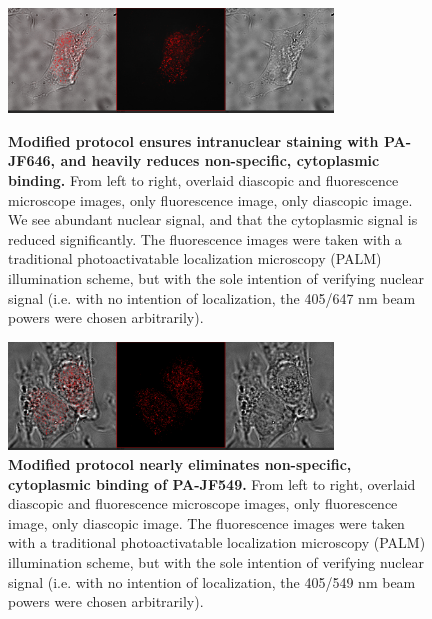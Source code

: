 \documentclass[%
 reprint,
 amsmath,amssymb,
 aps,
nobalancelastpage
]{revtex4-1}
\begin{document}
\begin{figure}[b] 
\includegraphics[width=3.4in]{Halo-tag PA646 - Fusion - 2x Mag - Area 1 - overlay.jpg}
\caption{\small \textbf{Modified protocol ensures intranuclear staining with PA-JF646, and heavily reduces non-specific, cytoplasmic binding.} From left to right, overlaid diascopic and fluorescence microscope images, only fluorescence image, only diascopic image. We see abundant nuclear signal, and that the cytoplasmic signal is reduced significantly. The fluorescence images were taken with a traditional photoactivatable localization microscopy (PALM) illumination scheme, but with the sole intention of verifying nuclear signal (i.e. with no intention of localization, the 405/647 nm beam powers were chosen arbitrarily).}
\label{fig1}
\hspace{1cm}
\includegraphics[width=3.4in]{Halo-tag PA549 - Fusion - 2x Mag - Area 4 - overlay.jpg}
\caption{\small \textbf{Modified protocol nearly eliminates non-specific, cytoplasmic binding of PA-JF549.} From left to right, overlaid diascopic and fluorescence microscope images, only fluorescence image, only diascopic image. The fluorescence images were taken with a traditional photoactivatable localization microscopy (PALM) illumination scheme, but with the sole intention of verifying nuclear signal (i.e. with no intention of localization, the 405/549 nm beam powers were chosen arbitrarily).}
\label{fig2}
\end{figure}
\end{document}
